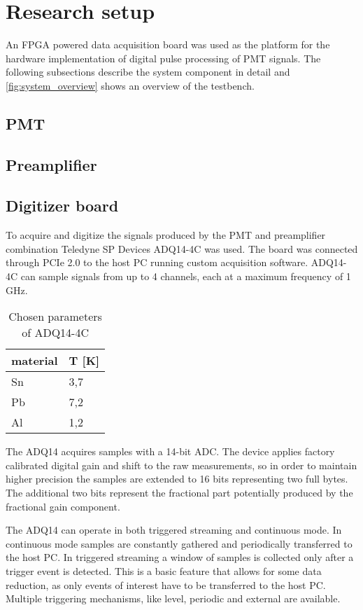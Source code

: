 \section{Research setup}
An FPGA powered data acquisition board was used as the platform 
for the hardware implementation of digital pulse processing of PMT
signals.
The following subsections describe the system component in detail and
\autoref{fig:system_overview} shows an overview of the testbench.
\subsection{PMT}
\subsection{Preamplifier}
\subsection{Digitizer board}
To acquire and digitize the signals produced by the PMT and preamplifier
combination Teledyne SP Devices ADQ14-4C was used. The board was connected
through PCIe 2.0 to the host PC running custom acquisition software.
ADQ14-4C can sample signals from up to 4 channels, each at a maximum
frequency of 1 GHz. 
\begin{table}[ht]
\caption{Chosen parameters of ADQ14-4C}
\centering
  \begin{tabular}{l l}
    material  & T [K]\\
    \hline
    Sn                     & 3,7 \\
    Pb                     & 7,2 \\
    Al                     & 1,2\\
  \end{tabular}
  \label{tab:adq14_datasheet}
\end{table}


The ADQ14 acquires samples with a 14-bit ADC.
The device applies factory calibrated digital gain and shift
to the raw measurements, 
so in order to maintain higher precision the samples are 
extended to 16 bits representing two full bytes. 
The additional two bits represent the fractional part potentially
produced by the fractional gain component.


The ADQ14 can operate in both triggered streaming and continuous mode.
In continuous mode samples are constantly gathered and periodically
transferred to the host PC. In triggered streaming a window of samples is 
collected only after a trigger event is detected. This is a basic feature
that allows for some data reduction, as only events of interest have to
be transferred to the host PC. Multiple triggering mechanisms, 
like level, periodic and external are available.


